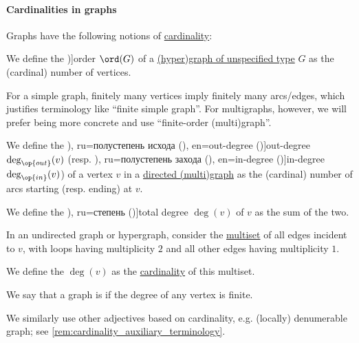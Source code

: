 \paragraph{Cardinalities in graphs}

\begin{definition}\label{def:graph_cardinality}
  Graphs have the following notions of \hyperref[def:cardinality]{cardinality}:
  \begin{thmenum}
     We define the \term[ru=порядок (\cite[9]{ЕмеличевИПр1990ТеорияГрафов})]{order} \( \ord(G) \) of a \hyperref[rem:graph_of_unspecified_type]{(hyper)graph of unspecified type} \( G \) as the (cardinal) number of vertices.

    For a simple graph, finitely many vertices imply finitely many arcs/edges, which justifies terminology like \enquote{finite simple graph}. For multigraphs, however, we will prefer being more concrete and use \enquote{finite-order (multi)graph}.

    \mimprovised We define the \term[bg=полустепен на изхода (\cite[8]{Мирчев2001Графи}), ru=полустепень исхода (\cite[283]{ЕмеличевИПр1990ТеорияГрафов}), en=out-degree (\cite[def. 1.1.7]{Knauer2019AlgebraicGraphTheory})]{out-degree} \( \deg_{\op{out}}(v) \) (resp. \term[bg=полустепен на входа (\cite[8]{Мирчев2001Графи}), ru=полустепень захода (\cite[283]{ЕмеличевИПр1990ТеорияГрафов}), en=in-degree (\cite[def. 1.1.8]{Knauer2019AlgebraicGraphTheory})]{in-degree} \( \deg_{\op{in}}(v) \)) of a vertex \( v \) in a \hyperref[def:directed_multigraph]{directed (multi)graph} as the (cardinal) number of arcs starting (resp. ending) at \( v \).

    We define the \term[bg=степен (\cite[8]{Мирчев2001Графи}), ru=степень (\cite[283]{ЕмеличевИПр1990ТеорияГрафов})]{total degree} \( \deg(v) \) of \( v \) as the sum of the two.

    \mimprovised In an undirected graph or hypergraph, consider the \hyperref[def:multiset]{multiset} of all edges incident to \( v \), with loops having multiplicity \( 2 \) and all other edges having multiplicity \( 1 \).

    We define the  \( \deg(v) \) as the \hyperref[def:multiset_cardinality]{cardinality} of this multiset.

     We say that a graph is  if the degree of any vertex is finite.
  \end{thmenum}
\end{definition}
\begin{comments}
  \item We similarly use other adjectives based on cardinality, e.g. (locally) denumerable graph; see \cref{rem:cardinality_auxiliary_terminology}.
\end{comments}

